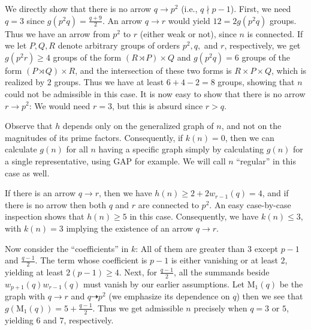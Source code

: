 \documentclass{article}
\newcommand{\m}[1]{\text{M}_{#1}}
\theoremstyle{plain}
\theoremstyle{definition}
\begin{document}
We directly show that there is no arrow $q \rightarrow p^2$ (i.e., $q \nmid p - 1$). First, we need $q = 3$ since $g(p^2 q) = \frac{q + 9}{2}$. An arrow $q \rightarrow r$ would yield $12 = 2g(p^2 q)$ groups. Thus we have an arrow from $p^2$ to $r$ (either weak or not), since $n$ is connected. If we let $P, Q, R$ denote arbitrary groups of orders $p^2, q,$ and $r$, respectively, we get $g(p^2 r) \ge 4$ groups of the form $(R \rtimes P) \times Q$ and $g(p^2 q) = 6$ groups of the form $(P \rtimes Q) \times R$, and the intersection of these two forms is $R \times P \times Q$, which is realized by $2$ groups. Thus we have at least $6 + 4 - 2 = 8$ groups, showing that $n$ could not be admissible in this case. It is now easy to show that there is no arrow $r \rightarrow p^2$: We would need $r = 3$, but this is absurd since $r > q$.

Observe that $h$ depends only on the generalized graph of $n$, and not on the magnitudes of its prime factors. Consequently, if $k(n) = 0$, then we can calculate $g(n)$ for all $n$ having a specific graph simply by calculating $g(n)$ for a single representative, using GAP\cite{cubefreepkg, GAP4} for example. We will call $n$ ``regular'' in this case as well.

If there is an arrow $q \rightarrow r$, then we have $h(n) \ge 2 + 2w_{r - 1}(q) = 4$, and if there is no arrow then both $q$ and $r$ are connected to $p^2$. An easy case-by-case inspection shows that $h(n) \ge 5$ in this case. Consequently, we have $k(n) \le 3$, with $k(n) = 3$ implying the existence of an arrow $q \rightarrow r$.

Now consider the ``coefficients'' in $k$: All of them are greater than $3$ except $p - 1$ and $\frac{q - 1}{2}$. The term whose coefficient is $p - 1$ is either vanishing or at least $2$, yielding at least $2(p - 1) \ge 4$. Next, for $\frac{q - 1}{2}$, all the summands beside $w_{p + 1}(q)w_{r - 1}(q)$ must vanish by our earlier assumptions. Let $\m1(q)$ be the graph with $q \rightarrow r$ and $q \dashrightarrow p^2$ (we emphasize its dependence on $q$) then we see that $g(\m1(q)) = 5 + \frac{q - 1}{2}$. Thus we get admissible $n$ precisely when $q = 3$ or $5$, yielding $6$ and $7$, respectively.
\end{document}
